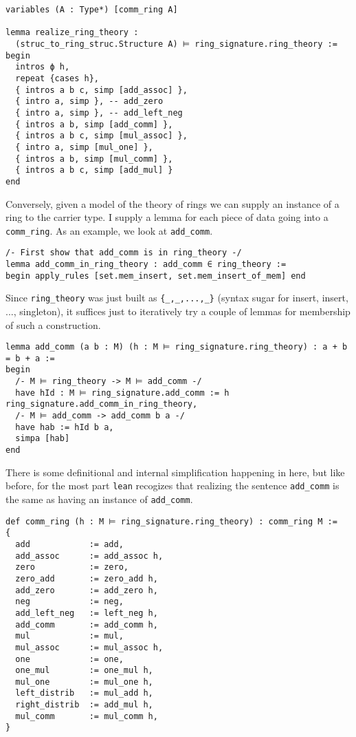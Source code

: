 \begin{lstlisting}
variables (A : Type*) [comm_ring A]

lemma realize_ring_theory :
  (struc_to_ring_struc.Structure A) ⊨ ring_signature.ring_theory :=
begin
  intros ϕ h,
  repeat {cases h},
  { intros a b c, simp [add_assoc] },
  { intro a, simp }, -- add_zero
  { intro a, simp }, -- add_left_neg
  { intros a b, simp [add_comm] },
  { intros a b c, simp [mul_assoc] },
  { intro a, simp [mul_one] },
  { intros a b, simp [mul_comm] },
  { intros a b c, simp [add_mul] }
end
\end{lstlisting}

Conversely, given a model of the theory of rings
we can supply an instance of a ring to the carrier type.
I supply a lemma for each piece of data going into a \texttt{comm\_ring}.
As an example, we look at \texttt{add\_comm}.

\begin{lstlisting}
/- First show that add_comm is in ring_theory -/
lemma add_comm_in_ring_theory : add_comm ∈ ring_theory :=
begin apply_rules [set.mem_insert, set.mem_insert_of_mem] end\end{lstlisting}

Since \texttt{ring\_theory} was just built as
\texttt{\{\_,\_,...,\_\}} (syntax sugar for
insert, insert, ..., singleton), it suffices just to iteratively
try a couple of lemmas for membership of such a construction.

\begin{lstlisting}
lemma add_comm (a b : M) (h : M ⊨ ring_signature.ring_theory) : a + b = b + a :=
begin
  /- M ⊨ ring_theory -> M ⊨ add_comm -/
  have hId : M ⊨ ring_signature.add_comm := h ring_signature.add_comm_in_ring_theory,
  /- M ⊨ add_comm -> add_comm b a -/
  have hab := hId b a,
  simpa [hab]
end\end{lstlisting}

There is some definitional and internal simplification happening in here,
but like before, for the most part \texttt{lean} recogizes that
realizing the sentence \texttt{add\_comm} is the same as having
an instance of \texttt{add\_comm}.

\begin{lstlisting}
def comm_ring (h : M ⊨ ring_signature.ring_theory) : comm_ring M :=
{
  add            := add,
  add_assoc      := add_assoc h,
  zero           := zero,
  zero_add       := zero_add h,
  add_zero       := add_zero h,
  neg            := neg,
  add_left_neg   := left_neg h,
  add_comm       := add_comm h,
  mul            := mul,
  mul_assoc      := mul_assoc h,
  one            := one,
  one_mul        := one_mul h,
  mul_one        := mul_one h,
  left_distrib   := mul_add h,
  right_distrib  := add_mul h,
  mul_comm       := mul_comm h,
}\end{lstlisting}

